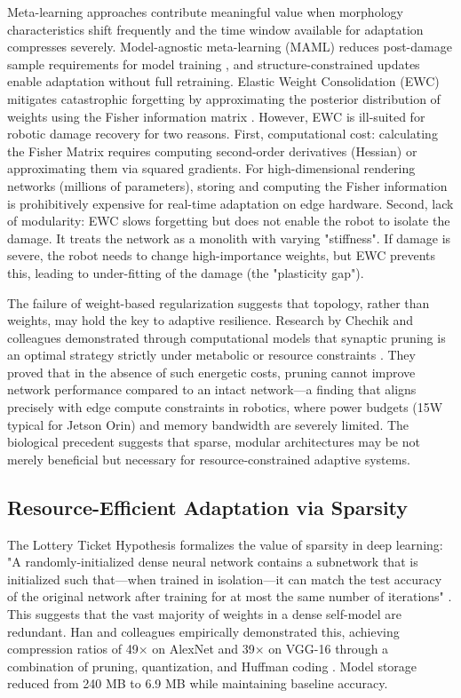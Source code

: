 \documentclass[12pt,a4paper,oneside]{report}
\begin{document}
Meta-learning approaches contribute meaningful value when morphology characteristics shift frequently and the time window available for adaptation compresses severely. Model-agnostic meta-learning (MAML) reduces post-damage sample requirements for model training \cite{finn2017maml}, and structure-constrained updates enable adaptation without full retraining. Elastic Weight Consolidation (EWC) mitigates catastrophic forgetting by approximating the posterior distribution of weights using the Fisher information matrix \cite{kirkpatrick2017overcoming}. However, EWC is ill-suited for robotic damage recovery for two reasons. First, computational cost: calculating the Fisher Matrix requires computing second-order derivatives (Hessian) or approximating them via squared gradients. For high-dimensional rendering networks (millions of parameters), storing and computing the Fisher information is prohibitively expensive for real-time adaptation on edge hardware. Second, lack of modularity: EWC slows forgetting but does not enable the robot to isolate the damage. It treats the network as a monolith with varying "stiffness". If damage is severe, the robot needs to change high-importance weights, but EWC prevents this, leading to under-fitting of the damage (the "plasticity gap").

The failure of weight-based regularization suggests that topology, rather than weights, may hold the key to adaptive resilience. Research by Chechik and colleagues demonstrated through computational models that synaptic pruning is an optimal strategy strictly under metabolic or resource constraints \cite{chechik1998synaptic}. They proved that in the absence of such energetic costs, pruning cannot improve network performance compared to an intact network—a finding that aligns precisely with edge compute constraints in robotics, where power budgets (15W typical for Jetson Orin) and memory bandwidth are severely limited. The biological precedent suggests that sparse, modular architectures may be not merely beneficial but necessary for resource-constrained adaptive systems.

\subsection{Resource-Efficient Adaptation via Sparsity}
\label{subsec:resource_efficient_adaptation_via_sparsity}

The Lottery Ticket Hypothesis formalizes the value of sparsity in deep learning: "A randomly-initialized dense neural network contains a subnetwork that is initialized such that—when trained in isolation—it can match the test accuracy of the original network after training for at most the same number of iterations" \cite{frankle2018lottery}. This suggests that the vast majority of weights in a dense self-model are redundant. Han and colleagues empirically demonstrated this, achieving compression ratios of 49× on AlexNet and 39× on VGG-16 through a combination of pruning, quantization, and Huffman coding \cite{han2015deep}. Model storage reduced from 240 MB to 6.9 MB while maintaining baseline accuracy.
\end{document}
